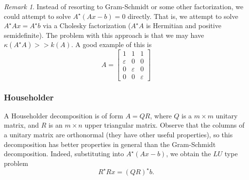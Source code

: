 \documentclass[12pt]{article}
\newcommand{\ee}{\varepsilon}
\theoremstyle{plain}
\theoremstyle{definition}
\theoremstyle{remark}
\newtheorem*{remark}{Remark}
\numberwithin{equation}{section}  %
\begin{document}
\begin{remark}
	Instead of resorting to Gram-Schmidt or some other factorization, we could
	attempt to solve $ A^{\star}(Ax - b) = 0 $ directly. That is, we attempt to
	solve $ A^{\star}Ax = A^{\star}b $ via a Cholesky factorization ($ A^{\star}A$
	is Hermitian and positive semidefinite). The problem with this approach is that
	we may have $\kappa(A^{\star}A) >> k(A)$. A good example of this is 
	\begin{equation*}
		A = 
		\begin{bmatrix}
			1 & 1 & 1 \\
			\ee & 0 & 0 \\
			0 & \ee & 0 \\
			0 & 0 & \ee 
		\end{bmatrix}
	\end{equation*}
\end{remark}
\subsubsection*{Householder}
A Householder decomposition is of form $A = QR$, where $Q$ is a $m \times m$ unitary matrix, and
$R$ is an $m \times n$ upper triangular matrix. Observe that the columns of a unitary matrix
are orthonormal (they have other useful properties), so this decomposition has better properties
in general than the Gram-Schmidt decomposition. Indeed, substituting into $A^{\star}(Ax-b)$, we 
obtain the $LU$ type problem
\begin{equation*}
	R^{\star}R x = (QR)^{\star} b.
\end{equation*}
\end{document}
